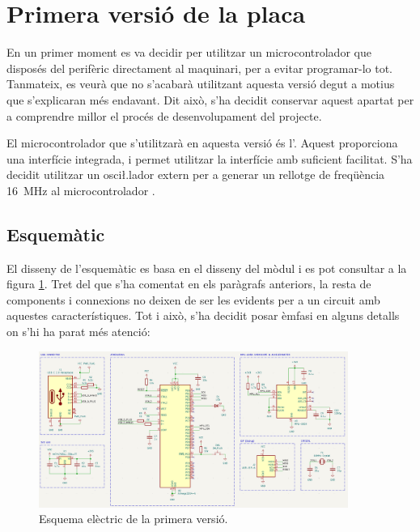 \section{Primera versió de la placa}

En un primer moment es va decidir per utilitzar un microcontrolador que disposés
del perifèric  directament al maquinari, per a evitar programar-lo tot.
Tanmateix, es veurà que no s'acabarà utilitzant aquesta versió degut a motius
que s'explicaran més endavant. Dit això, s'ha decidit conservar aquest apartat
per a comprendre millor el procés de desenvolupament del projecte.

El microcontrolador que s'utilitzarà en aquesta versió és l'.
Aquest proporciona una interfície  integrada, i permet utilitzar la
interfície  amb suficient facilitat. S'ha decidit utilitzar un
osci\l.lador extern per a generar un rellotge de freqüència
\SI[round-mode=places,round-precision=0]{16}{\mega\hertz}
al microcontrolador \cite{AtMega32u4}.

\subsection{Esquemàtic}

El disseny de l'esquemàtic es basa en el disseny del mòdul  i es pot
consultar a la figura \ref{fig:sch_v1}. Tret del que s'ha comentat en els paràgrafs
anteriors, la resta de components i connexions no deixen de ser les evidents per
a un circuit amb aquestes característiques. Tot i això, s'ha decidit posar
èmfasi en alguns detalls on s'hi ha parat més atenció:

\begin{figure}[ht]
    \centering
    \includegraphics[width=0.9\textwidth]{images/kicad/gyro1_sch.png}
    \caption{Esquema elèctric de la primera versió.}
    \label{fig:sch_v1}
\end{figure}

